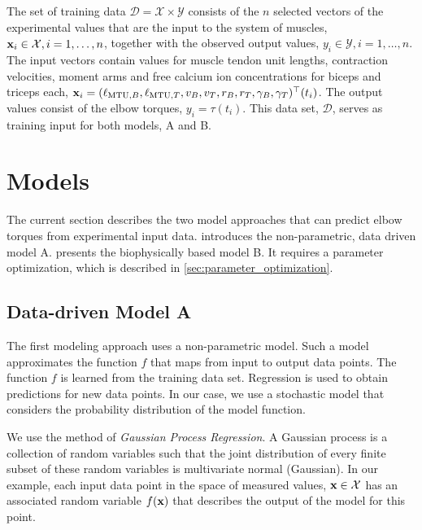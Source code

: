 The set of training data $\mathcal{D} = \mathcal{X} \times \mathcal{Y}$ consists of the $n$ selected vectors of the experimental values that are the input to the system of muscles, $\textbf{x}_i \in \mathcal{X}, i=1,\dots, n$, together with the observed output values, $y_i \in \mathcal{Y}, i=1,\dots,n$.
The input vectors contain values for muscle tendon unit lengths, contraction velocities, moment arms and free calcium ion concentrations for biceps and triceps each, $\textbf{x}_i = (\ell_{\text{MTU},B}, \ell_{\text{MTU},T}, v_B, v_T, r_{B}, r_{T}, \gamma_B, \gamma_T)^\top(t_i)$. The output values consist of the elbow torques, $y_i = \tau(t_i)$. This data set, $\mathcal{D}$, serves as training input for both models, A and B.

\section{Models}\label{sec:study_models}

The current section describes the two model approaches that can predict elbow torques from experimental input data.  introduces the non-parametric, data driven model A.  presents the biophysically based model B. It requires a parameter optimization, which is described in \cref{sec:parameter_optimization}.

\subsection{Data-driven Model A}\label{sec:data_driven_model}

The first modeling approach uses a non-parametric model. Such a model approximates the function $f$ that maps from input to output data points. The function $f$ is learned from the training data set. Regression is used to obtain predictions for new data points. In our case, we use a stochastic model that considers the probability distribution of the model function.

We use the method of \emph{Gaussian Process Regression}. A Gaussian process is a collection of random variables such that the joint distribution of every finite subset of these random variables is multivariate normal (Gaussian).
In our example, each input data point in the space of measured values, $\textbf{x} \in \mathcal{X}$ has an associated random variable $f(\textbf{x})$ that describes the output of the model for this point.

